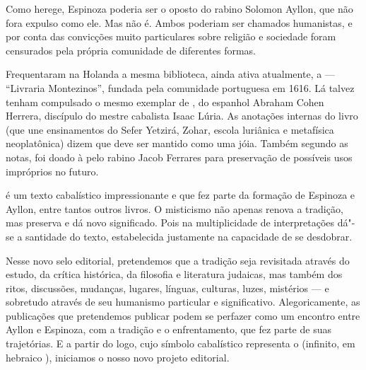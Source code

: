 \begin{multicols}{2}
Como herege, Espinoza poderia ser o oposto do rabino Solomon Ayllon, que não fora expulso como ele. Mas não é. Ambos poderiam ser chamados humanistas, e por conta das convicções muito particulares sobre religião e sociedade foram censurados pela própria comunidade de diferentes formas.

Frequentaram na Holanda a mesma biblioteca, ainda ativa atualmente, a {} --- ``Livraria Montezinos'', fundada pela comunidade portuguesa em 1616. Lá talvez tenham compulsado o mesmo exemplar de {}, do espanhol Abraham Cohen Herrera, discípulo do mestre cabalista Isaac Lúria. As anotações internas do livro (que une ensinamentos do Sefer Yetzirá, Zohar, escola luriânica e metafísica neoplatônica) dizem que deve ser mantido como uma jóia. Também segundo as notas, foi doado à {} pelo rabino Jacob Ferrares para preservação de possíveis usos impróprios no futuro.

{} é um texto cabalístico impressionante e que fez parte da formação de Espinoza e Ayllon, entre tantos outros livros. O misticismo não apenas renova a tradição, mas preserva e dá novo significado. Pois na multiplicidade de interpretações dá"-se a santidade do texto, estabelecida justamente na capacidade de se desdobrar.

Nesse novo selo editorial, pretendemos que a tradição seja revisitada através do estudo, da crítica histórica, da filosofia e literatura judaicas, mas também dos ritos, discussões, mudanças, lugares, línguas, culturas, luzes, mistérios --- e sobretudo através de seu humanismo particular e significativo. Alegoricamente, as publicações que pretendemos publicar podem se perfazer como um encontro entre Ayllon e Espinoza, com a tradição e o enfrentamento, que fez parte de suas trajetórias. E a partir do logo, cujo símbolo cabalístico representa o {} (infinito, em hebraico {}), iniciamos o nosso novo projeto editorial.

\noindent{}\textcolor{gray}{\footnotesize{}}
\end{multicols}

\pagebreak
